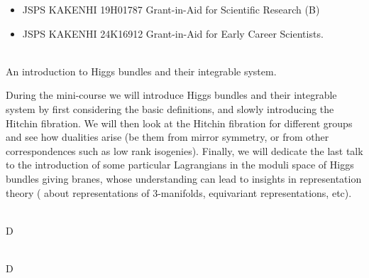 \documentclass[dvipdfmx,a4paper,12pt]{article}
\theoremstyle{plain} %
\theoremstyle{definition} %
\begin{document}


  \vspace{-11pt}
\begin{itemize}
  \setlength{\parskip}{0cm} 
  \setlength{\itemsep}{0cm}
\item JSPS KAKENHI 19H01787 Grant-in-Aid for Scientific Research (B)
\item JSPS KAKENHI 24K16912 Grant-in-Aid for Early Career Scientists.  
\end{itemize}









\newpage

\vskip5mm


\\
An introduction to Higgs bundles and their integrable system.

\vskip3mm
During the mini-course we will introduce Higgs bundles and
their integrable system by first considering the basic definitions,
and slowly introducing the Hitchin fibration. We will then look at the
Hitchin fibration for different groups and see how dualities arise (be
them from mirror symmetry, or from other correspondences such as low
rank isogenies). Finally, we will dedicate the last talk to the
introduction of some particular Lagrangians in the moduli space of
Higgs bundles giving branes, whose understanding can lead to insights
in representation theory ( about representations of 3-manifolds,
equivariant representations, etc).
\vskip6mm


\\


\vskip3mm
D
\vskip6mm

\\


\vskip3mm
D
\vskip6mm
\end{document}
